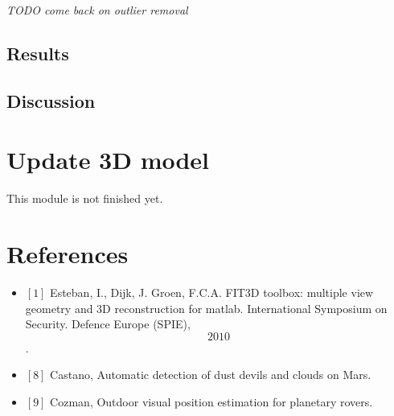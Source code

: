 \documentclass[10pt]{article}
\begin{document}
\textit{TODO come back on outlier removal}
\subsection{Results}


\subsection{Discussion}

\section{Update 3D model}
This module is not finished yet.


\section{References}
\begin{itemize}
\item $[1]$ 
Esteban, I., Dijk, J. Groen, F.C.A. FIT3D toolbox: multiple view geometry and
3D reconstruction for matlab. International Symposium on Security. Defence
Europe (SPIE), \[2010\].
\item $[8]$ Castano, Automatic detection of dust devils and clouds on Mars.
\item $[9]$ Cozman, Outdoor visual position estimation for planetary rovers.
\end{itemize}
\end{document}
